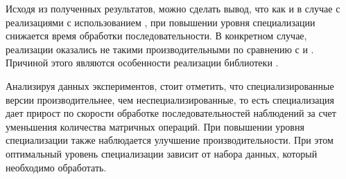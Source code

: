 %
%
%
%

Исходя из полученных результатов, можно сделать вывод, что 
как и в случае с реализациями с использованием 
, при повышении уровня специализации 
снижается время обработки последовательности.
В конкретном случае, реализации оказались не такими 
производительными по сравнению с  и 
.
Причиной этого являются особенности реализации библиотеки 
.

Анализируя данных экспериментов, стоит отметить, что 
специализированные версии производительнее, чем 
неспециализированные, то есть специализация дает прирост по 
скорости обработке последовательностей наблюдений за счет 
уменьшения количества матричных операций.
При повышении уровня специализации также наблюдается улучшение производительности.
При этом оптимальный уровень специализации зависит от набора 
данных, который необходимо обработать.

\newpage